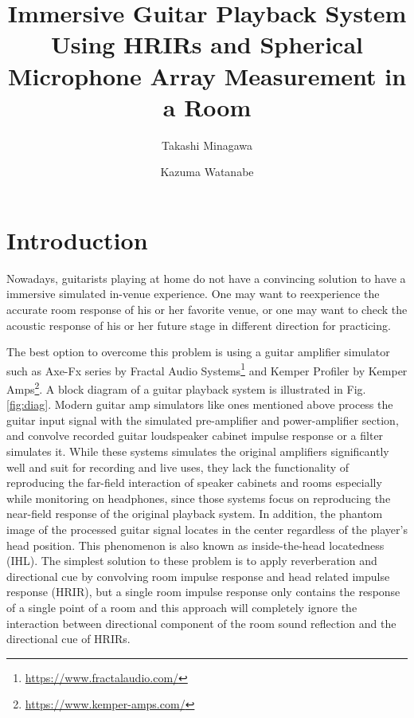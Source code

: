 \documentclass[convention,e-brief]{aesconf-current}
\title{Immersive Guitar Playback System Using HRIRs and Spherical Microphone Array Measurement in a Room}
\author[1]{Takashi Minagawa}
\author[1]{Kazuma Watanabe}
\affil[1]{Graduate School of Design, Kyushu University}
\begin{document}

\section{Introduction}

Nowadays, guitarists playing at home do not have a convincing solution to have a immersive simulated in-venue experience.
One may want to reexperience the accurate room response of his or her favorite venue, or one may want to check the acoustic response of his or her future stage in different direction for practicing.

The best option to overcome this problem is using a guitar amplifier simulator such as Axe-Fx series by Fractal Audio Systems\footnote{\url{https://www.fractalaudio.com/}} and Kemper Profiler by Kemper Amps\footnote{\url{https://www.kemper-amps.com/}}.
A block diagram of a guitar playback system is illustrated in Fig.\ref{fig:diag}.
Modern guitar amp simulators like ones mentioned above process the guitar input signal with the simulated pre-amplifier and power-amplifier section, and convolve recorded guitar loudspeaker cabinet impulse response or a filter simulates it.
While these systems simulates the original amplifiers significantly well and suit for recording and live uses, they lack the functionality of reproducing the far-field interaction of speaker cabinets and rooms especially while monitoring on headphones, since those systems focus on reproducing the near-field response of the original playback system.
In addition, the phantom image of the processed guitar signal locates in the center regardless of the player's head position.
This phenomenon is also known as inside-the-head locatedness (IHL)\cite{roginska2017immersive}.
The simplest solution to these problem is to apply reverberation and directional cue by convolving room impulse response and head related impulse response (HRIR), but a single room impulse response only contains the response of a single point of a room and this approach will completely ignore the interaction between directional component of the room sound reflection and the directional cue of HRIRs.
\end{document}
